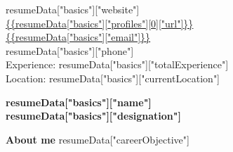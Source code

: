 \documentclass[a4paper,12pt,final]{memoir}
\newcommand{\Sep}{\vspace{1.5em}}
\newenvironment{AboutMe}
	{\ignorespaces\textbf{\color{RoyalBlue} About me}}
	{\Sep\ignorespacesafterend}
\begin{document}
\begin{flushright}\small
	{{resumeData["basics"]["website"]}}\\
	\url{ {{resumeData["basics"]["profiles"][0]["url"]}} } \\
	\url{ {{resumeData["basics"]["email"]}} } \\
	{{resumeData["basics"]["phone"]}}\\
	Experience: {{resumeData["basics"]["totalExperience"]}}\\
	Location: {{resumeData["basics"]["currentLocation"]}}\\
\end{flushright}\normalsize
\framebreak


\Huge\bfseries {\color{RoyalBlue} {{resumeData["basics"]["name"]}}} \\
\Large\bfseries  {{resumeData["basics"]["designation"]}} \\

\normalsize\normalfont

\begin{AboutMe}
{{resumeData["careerObjective"]}}
\end{AboutMe}
\end{document}
